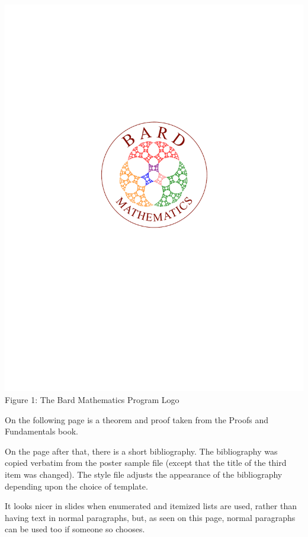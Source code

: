 \documentclass[12pt, oneside, reqno]{article}
\begin{document}
\begin{center}
\includegraphics[scale=0.75]{math_prog_logo.pdf}\\
Figure 1: The Bard Mathematics Program Logo
\end{center}



On the following page is a theorem and proof taken from the Proofs and Fundamentals book.

On the page after that, there is a short bibliography.  The bibliography was copied verbatim from the poster sample file (except that the title of the third item was changed).  The style file adjusts the appearance of the bibliography depending upon the choice of template.

It looks nicer in slides when enumerated and itemized lists are used, rather than having text in normal paragraphs, but, as seen on this page, normal paragraphs can be used too if someone so chooses.
\end{document}
